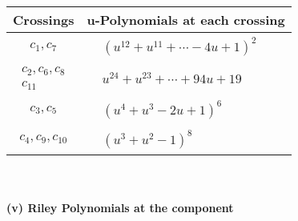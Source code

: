 \documentclass[1p]{elsarticle_modified}
\theoremstyle{definition}
\begin{document}
\begin{tabular}{m{50pt}|m{274pt}}
Crossings & \hspace{64pt}u-Polynomials at each crossing \\
\hline $$\begin{aligned}c_{1},c_{7}\end{aligned}$$&$\begin{aligned}
&(u^{12}+u^{11}+\cdots-4 u+1)^{2}
\end{aligned}$\\
\hline $$\begin{aligned}c_{2},c_{6},c_{8}\\c_{11}\end{aligned}$$&$\begin{aligned}
&u^{24}+u^{23}+\cdots+94 u+19
\end{aligned}$\\
\hline $$\begin{aligned}c_{3},c_{5}\end{aligned}$$&$\begin{aligned}
&(u^4+u^3-2 u+1)^6
\end{aligned}$\\
\hline $$\begin{aligned}c_{4},c_{9},c_{10}\end{aligned}$$&$\begin{aligned}
&(u^3+u^2-1)^8
\end{aligned}$\\
\hline
\end{tabular}\\~\\
\newpage\renewcommand{\arraystretch}{1}
\flushleft \textbf{(v) Riley Polynomials at the component}\newline \\
\end{document}

